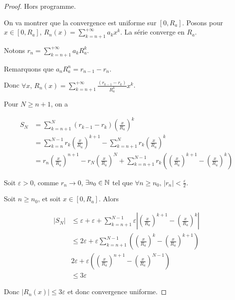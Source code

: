 \begin{proof}
    Hors programme. 

    On va montrer que la convergence est uniforme sur $[0, R_a]$. Posons pour $x \in [0, R_a]$, 
    $\displaystyle R_n(x) = \sum_{k = n + 1}^{+\infty} a_k x^k$. La série converge en $R_a$. 

    Notons $\displaystyle r_n = \sum_{k = n + 1}^{+\infty} a_k R_a^k$. 

    Remarquons que $a_n R_a^n = r_{n - 1} - r_n$. 

    Donc $\displaystyle \forall x, \, R_n(x) = \sum_{k = n + 1}^{+\infty} \frac{(r_{k - 1} - r_k)}{R_a^k } x^k$. 
    
    Pour $N \geqslant n + 1$, on a

    \begin{align}
        S_N & = \sum_{k = n + 1 }^{N } (r_{k - 1} - r_k) \left( \frac x {R_a} \right)^k \\
        & = \sum_{k = n }^{ N - 1 } r_k \left(\frac x {R_a} \right)^{k + 1} - \sum_{k = n + 1}^N r_k \left( \frac x {R_a} \right)^k \\
        & = r_n \left( \frac{x }{R_a} \right)^{n + 1} - r_N \left( \frac x {R_a} \right)^N + \sum_{k = n + 1}^{N - 1} r_k \left( \left( \frac x {R_a} \right)^{k + 1} - \left( \frac x {R_a} \right)^k \right)
    \end{align}

    Soit $\varepsilon > 0$, comme $r_n \to 0$, $\exists n_0 \in \mathbb{N}$ tel que $\forall n \geqslant n_0, \, |r_n| < \frac{\varepsilon }{2 }$.

    Soit $n \geqslant n_0$, et soit $x \in [0, R_a]$.
    Alors 

    \begin{align}
        |S_N| & \leqslant \varepsilon + \varepsilon + \sum_{k = n + 1}^{N - 1}  \varepsilon \left| \left( \frac x {R_a} \right)^{k +1} - \left( \frac{x}{R_a } \right)^{k} \right| \\
        & \leqslant 2 \varepsilon + \varepsilon \sum_{k = n + 1}^{N - 1} \left( \left( \frac x {R_a} \right)^k - \left( \frac x {R_a} \right)^{k + 1} \right) \\ 
        & 2 \varepsilon + \varepsilon \left( \left( \frac x {R_a} \right)^{n + 1} - \left( \frac x {R_a} \right)^{N - 1}\right) \\
        & \leqslant 3 \varepsilon
    \end{align}

    Donc $|R_n(x)| \leqslant 3 \varepsilon$ et donc convergence uniforme. 
\end{proof}

